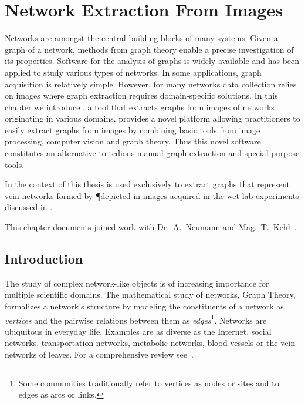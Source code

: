 \chapter{Network Extraction From Images}\label{chap:nefi}

	Networks are amongst the central building blocks of many systems. Given a graph of a network, methods from graph theory enable a precise investigation of its properties. Software for the analysis of graphs is widely available and has been applied to study various types of networks. In some applications, graph acquisition is relatively simple. However, for many networks data collection relies on images where graph extraction requires domain-specific solutions.	In this chapter we introduce \NEFI, a tool that extracts graphs from images of networks originating in various domains. \NEFI provides a novel platform allowing practitioners to easily extract graphs from images by combining basic tools from image processing, computer vision and graph theory. Thus this novel software constitutes an alternative to tedious manual graph extraction and special purpose tools. 

	In the context of this thesis \NEFI is used exclusively to extract graphs that represent vein networks formed by \P depicted in images acquired in the wet lab experiments discussed in .

	This chapter documents joined work with Dr.~A.~Neumann and Mag.~T.~Kehl~\cite{dirnberger2015nefi}.

\section{Introduction}

	The study of complex network-like objects is of increasing importance for multiple scientific domains. The mathematical study of networks, Graph Theory, formalizes a network's structure by modeling the constituents of a network as \emph{vertices} and the pairwise relations between them as \emph{edges}\footnote{Some communities traditionally refer to vertices as nodes or sites and to edges as arcs or links.}. Networks are ubiquitous in everyday life. Examples are as diverse as the Internet, social networks, transportation networks, metabolic networks, blood vessels or the vein networks of leaves. For a comprehensive review see~\cite{newman2003structure}. 

